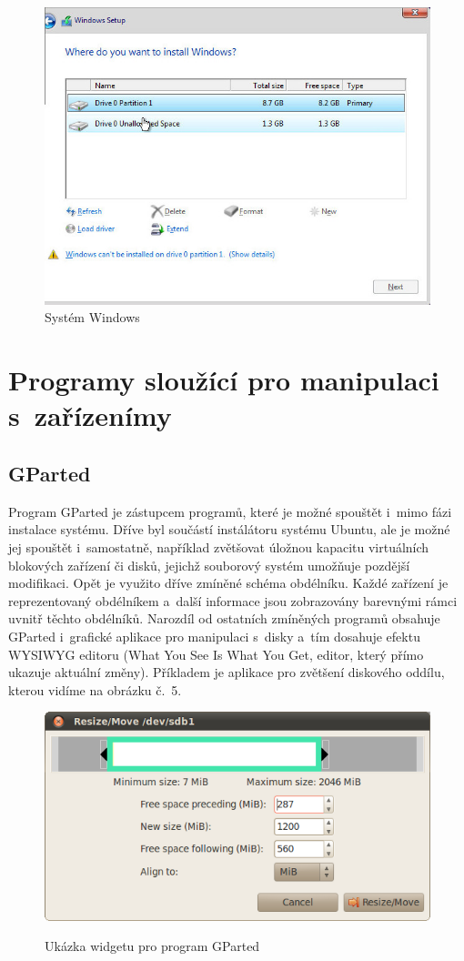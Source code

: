\documentclass[color,table,oneside,nolot,nolof]{fithesis}
\begin{document}
\begin{figure}[h!]
	\label{fig:win}
	\caption{Systém Windows}
	\centering
	\includegraphics[width=.6\columnwidth]{pictures/win1.jpg}
\end{figure}

\section{Programy sloužící pro manipulaci s~zařízenímy}

\subsection{GParted}

Program GParted je zástupcem programů, které je možné spouštět i~mimo fázi instalace systému. Dříve byl součástí instálátoru systému Ubuntu, ale je možné jej spouštět i~samostatně, například 
 zvětšovat úložnou kapacitu virtuálních blokových zařízení či disků, jejichž souborový systém umožňuje pozdější modifikaci. Opět je využito dříve zmíněné schéma obdélníku. Každé zařízení je reprezentovaný 
 obdélníkem a~další informace jsou zobrazovány barevnými rámci uvnitř těchto obdélníků. Narozdíl od ostatních zmíněných programů obsahuje GParted i~grafické aplikace pro manipulaci s~disky 
 a~tím dosahuje efektu WYSIWYG editoru (What You See Is What You Get, editor, který přímo ukazuje aktuální změny). Příkladem je aplikace pro zvětšení diskového oddílu, kterou vidíme na obrázku č.~5.

 \begin{figure}[h!]
	 \label{fig:gparted}
	 \caption{Ukázka widgetu pro program GParted~\cite{GParted}}
	 \centering
	 \includegraphics[width=.6\columnwidth]{pictures/gparted-5-big.png}\\
 \end{figure}
\end{document}
